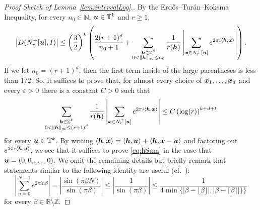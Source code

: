 \documentclass[12pt,a4paper]{amsart}
\numberwithin{equation}{section}
\theoremstyle{definition}
\begin{document}
\begin{proof}[Proof Sketch of Lemma~\ref{lem:intervalLog}.]
By the Erd\H{o}s--Tur\'{a}n--Koksma Inequality, for every $n_0\in\mathbb{N}$, $\boldsymbol{u}\in\mathbb{T}^k$ and $r\geq1$, 
\[\left|D(N_r^+[\boldsymbol{u}],I)\right|\leq \left(\frac{3}{2}\right)^k\left(\frac{2(r+1)^d}{n_0+1} + \sum_{\substack{\boldsymbol{h}\in \mathbb{Z}^k\\ 0<\|\boldsymbol{h}\|_\infty\leq n_0}}\frac{1}{r(\boldsymbol{h})}\left|\sum_{\boldsymbol{x}\in N_r^+[\boldsymbol{u}]}e^{2\pi i \langle \boldsymbol{h},\boldsymbol{x}\rangle}\right|\right).\]
If we let $n_0=(r+1)^d$, then the first term inside of the large parentheses is less than $1/2$. So, it suffices to prove that, for almost every choice of $\boldsymbol{x}_1,\dots,\boldsymbol{x}_d$ and every $\varepsilon>0$ there is a constant $C>0$ such that
\begin{equation}\label{eq:hSum}\sum_{\substack{\boldsymbol{h}\in \mathbb{Z}^k\\ 0<\|\boldsymbol{h}\|_\infty\leq (r+1)^d}}\frac{1}{r(\boldsymbol{h})}\left|\sum_{\boldsymbol{x}\in N_r^+[\boldsymbol{u}]}e^{2\pi i \langle \boldsymbol{h},\boldsymbol{x}\rangle}\right| \leq C\left(\log(r)\right)^{k+d+t}
\end{equation}
for every $\boldsymbol{u}\in \mathbb{T}^k$. By writing $\langle \boldsymbol{h},\boldsymbol{x}\rangle = \langle \boldsymbol{h},\boldsymbol{u}\rangle+\langle \boldsymbol{h},\boldsymbol{x}-\boldsymbol{u}\rangle$ and factoring out $e^{2\pi i \langle \boldsymbol{h},\boldsymbol{u}\rangle}$, we see that it suffices to prove \eqref{eq:hSum} in the case that $\boldsymbol{u}=(0,0,\dots,0)$. We omit the remaining details but briefly remark that statements similar to the following identity are useful (cf.~\cite[p.~152]{TomkowiczWagon16}):
\[\left|\sum_{n=0}^{N-1}e^{2\pi i n\beta}\right|=\left|\frac{\sin(\pi\beta N)}{\sin(\pi\beta)}\right| \leq \left|\frac{1}{\sin(\pi\beta)}\right|\leq\frac{1}{4\min\{|\beta-\lfloor \beta\rfloor|,|\beta-\lceil \beta\rceil|\}\}}\]
for every $\beta\in\mathbb{R}\setminus \mathbb{Z}$. 
\end{proof} 
\end{document}
